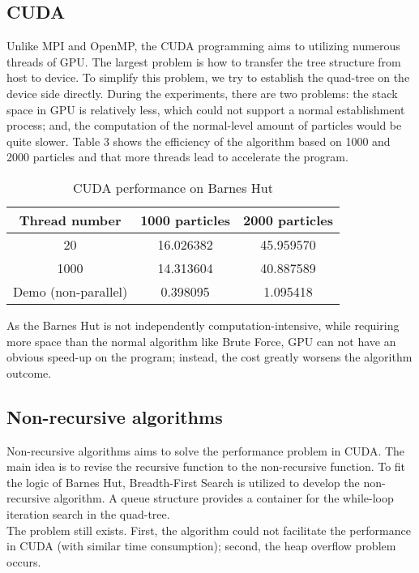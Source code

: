 \documentclass{scrartcl}
\begin{document}
\subsection{CUDA}
\noindent
Unlike MPI and OpenMP, the CUDA programming aims to utilizing numerous threads of GPU. The largest problem is how to transfer the tree structure from host to device. To simplify this problem, we try to establish the quad-tree on the device side directly. During the experiments, there are two problems: the stack space in GPU is relatively less, which could not support a normal establishment process; and, the computation of the normal-level amount of particles would be quite slower. Table 3 shows the efficiency of the algorithm based on 1000 and 2000 particles and that more threads lead to accelerate the program.
\begin{center}
\begin{table}
\footnotesize
\begin{center}
\begin{tabular}{ccc}
\hline
Thread number& 1000 particles& 2000 particles\\
\hline
20& 16.026382& 45.959570\\
1000& 14.313604& 40.887589\\
Demo (non-parallel)&0.398095&1.095418\\
\hline
\end{tabular}
\end{center}
\caption{CUDA performance on Barnes Hut}
\end{table}
\end{center}
As the Barnes Hut is not independently computation-intensive, while requiring more space than the normal algorithm like Brute Force, GPU can not have an obvious speed-up on the program; instead, the cost greatly worsens the algorithm outcome.

\subsection{Non-recursive algorithms}
\noindent
Non-recursive algorithms aims to solve the performance problem in CUDA. The main idea is to revise the recursive function to the non-recursive function. To fit the logic of Barnes Hut, Breadth-First Search is utilized to develop the non-recursive algorithm. A queue structure provides a container for the while-loop iteration search in the quad-tree.\\
The problem still exists. First, the algorithm could not facilitate the performance in CUDA (with similar time consumption); second, the heap overflow problem occurs.
\end{document}
